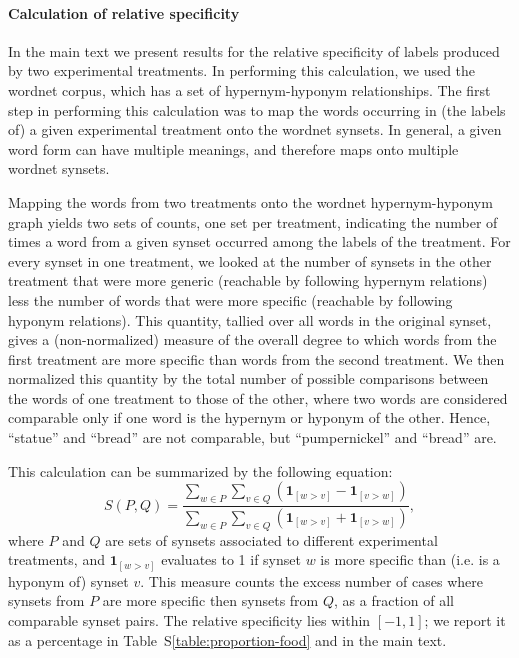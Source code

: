 \documentclass[12pt]{article}
\begin{document}
\paragraph{Calculation of relative specificity}
In the main text we present results for the relative specificity of labels
produced by two experimental treatments.  In performing this calculation,
we used the wordnet corpus, which has a set of hypernym-hyponym relationships.
The first step in performing this calculation was to map the words occurring 
in (the labels of) a given experimental treatment onto the wordnet synsets.  
In general, a given word
form can have multiple meanings, and therefore maps onto multiple wordnet 
synsets.

Mapping the words from two treatments onto the wordnet 
hypernym-hyponym graph yields two sets of counts, one set per treatment, 
indicating the number of times a word from a given synset occurred among the
labels of the treatment.  For every synset in one treatment, we looked
at the number of synsets in the other treatment that were more generic
(reachable by following hypernym relations) less the number of words that
were more specific (reachable by following hyponym relations).  This quantity,
tallied over all words in the original synset, gives a (non-normalized) 
measure of the overall degree to which words from the first treatment are more
specific than words from the second treatment.  We then normalized this 
quantity by the total number of possible comparisons between the words of
one treatment to those of the other, where two words are considered comparable
only if one word is the hypernym or hyponym of the other.  Hence, ``statue'' 
and ``bread'' are not comparable, but ``pumpernickel'' and ``bread'' are.

This calculation can be summarized by the following equation:
\begin{equation}
	S(P,Q) = \frac{
		\sum_{w\in P}\sum_{v\in Q} \left(
			\mathbf{1}_{[w>v]} - \mathbf{1}_{[v>w]} \right)
	}{
		\sum_{w\in P}\sum_{v\in Q} \left(
			\mathbf{1}_{[w>v]} + \mathbf{1}_{[v>w]} \right)
	},
\end{equation}
where $P$ and $Q$ are sets of synsets associated to different experimental 
treatments, and $\mathbf{1}_{[w>v]}$ evaluates
to 1 if synset $w$ is more specific than (i.e. is a hyponym of) synset $v$.
This measure counts the excess number of cases where synsets from $P$ are more
specific then synsets from $Q$, as a fraction of all comparable synset pairs. 
The relative specificity lies within $[-1,1]$; we report it as a percentage 
in Table~S\ref{table:proportion-food} and in the main text.
\end{document}
